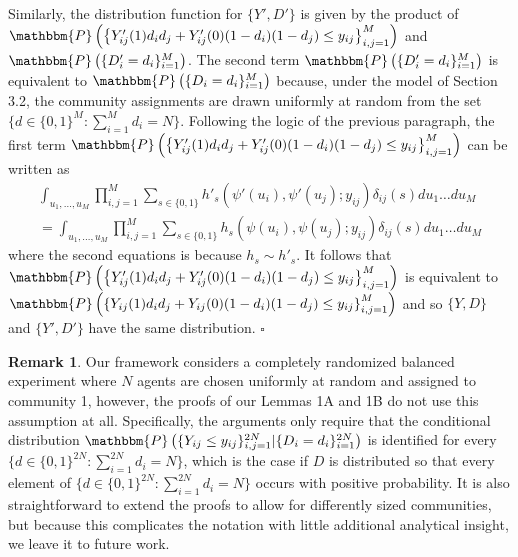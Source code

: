 \documentclass[12pt]{article}
\theoremstyle{definition}
\newtheorem{remark}{Remark}
\begin{document}
\begin{flushleft}
Similarly, the distribution function for $\{Y',D'\}$ is given by the product of $\mathbbm{P}\left(\left\{Y'_{ij}(1)d_i d_j + Y'_{ij}(0)(1-d_i)(1-d_j) \leq y_{ij}\right\}_{i,j=1}^{M}\right)$ and $\mathbbm{P}\left(\{D'_i = d_i\}_{i=1}^{M}\right)$. The second term  $\mathbbm{P}\left(\{D'_i = d_i\}_{i=1}^{M}\right)$ is equivalent to $\mathbbm{P}\left(\{D_i = d_i\}_{i=1}^{M}\right)$ because, under the model of Section 3.2, the community assignments are drawn uniformly at random from the set $\{d \in \{0,1\}^{M}: \sum_{i=1}^{M}d_i = N\}$. Following the logic of the previous paragraph, the first term $\mathbbm{P}\left(\left\{Y'_{ij}(1)d_i d_j + Y'_{ij}(0)(1-d_i)(1-d_j) \leq y_{ij}\right\}_{i,j=1}^{M}\right)$ can be written as 
\begin{align*}
 \int_{u_1,\ldots,u_{M}}\prod_{i,j=1}^{M} \sum_{s \in \{0,1\}}h'_{s}(\psi'(u_i),\psi'(u_j); y_{ij})\delta_{ij}(s) du_1\ldots du_{M} \\
 =  \int_{u_1,\ldots,u_{M}}\prod_{i,j=1}^{M} \sum_{s \in \{0,1\}}h_{s}(\psi(u_i),\psi(u_j); y_{ij})\delta_{ij}(s)du_1\ldots du_{M}
 \end{align*}
where the second equations is because $h_{s} \sim h'_{s}$. It follows that $\mathbbm{P}\left(\left\{Y'_{ij}(1)d_i d_j + Y'_{ij}(0)(1-d_i)(1-d_j) \leq y_{ij}\right\}_{i,j=1}^{M}\right)$ is equivalent to $\mathbbm{P}\left(\left\{Y_{ij}(1)d_i d_j + Y_{ij}(0)(1-d_i)(1-d_j) \leq y_{ij}\right\}_{i,j=1}^{M}\right)$ and so $\{Y,D\}$ and $\{Y',D'\}$ have the same distribution. $\square$

\end{flushleft}

\begin{remark}
Our framework considers a completely randomized balanced experiment where $N$ agents are chosen uniformly at random and assigned to community 1, however, the proofs of our Lemmas 1A and 1B do not use this assumption at all. Specifically, the arguments only require that the conditional distribution $\mathbbm{P}\left(\{Y_{ij} \leq y_{ij} \}_{i,j=1}^{2N}|\{D_i = d_i\}_{i=1}^{2N}\right)$ is identified for every $\{ d \in \{0,1\}^{2N} :  \sum_{i=1}^{2N}d_i = N\}$, which is the case if $D$ is distributed so that every element of $\{ d \in \{0,1\}^{2N} :  \sum_{i=1}^{2N}d_i = N\}$ occurs with positive probability. It is also straightforward to extend the proofs to allow for differently sized communities, but because this complicates the notation with little additional analytical insight, we leave it to future work.   
\end{remark}
\end{document}
